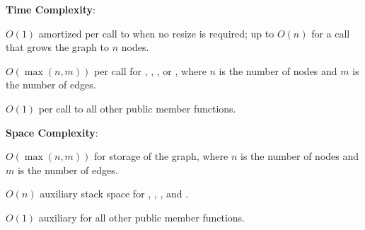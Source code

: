 \textbf{Time Complexity}:
\begin{compactitem}
  \item $O(1)$ amortized per call to  when no resize is required; up to $O(n)$ for a call that grows the graph to $n$ nodes.
  \item $O(\max\left(n, m\right))$ per call for , , , or , where $n$ is the number of nodes and $m$ is the number of edges.
  \item $O(1)$ per call to all other public member functions.
\end{compactitem}

\textbf{Space Complexity}:
\begin{compactitem}
  \item $O(\max\left(n, m\right))$ for storage of the graph, where $n$ is the number of nodes and $m$ is the number of edges.
  \item $O(n)$ auxiliary stack space for , , , and .
  \item $O(1)$ auxiliary for all other public member functions.
\end{compactitem}

